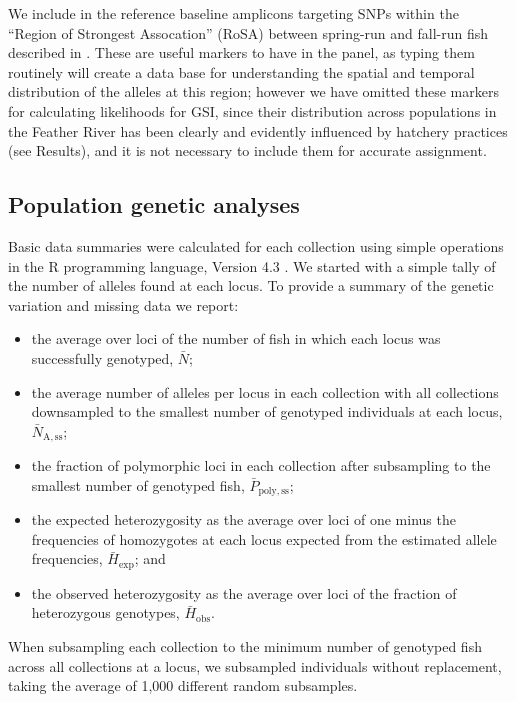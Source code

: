 We include in the reference baseline amplicons targeting SNPs within the ``Region of Strongest Assocation'' (RoSA)
between spring-run and fall-run fish described in \citet{thompson2020complex}.  These are useful markers to
have in the panel, as typing them routinely will create a data base for understanding the spatial and temporal
distribution of the alleles at this region; however we have omitted these markers for calculating likelihoods for
GSI, since their distribution across populations in the Feather River has been clearly and evidently
influenced by hatchery practices (see Results), and it is not necessary to include them for accurate assignment.

\subsection*{Population genetic analyses}

Basic data summaries were calculated for each collection
using simple operations in the R programming language, Version 4.3
\citep{rcore}. We started with a simple tally of the number of alleles
found at each locus.  To provide a summary of the genetic variation and
missing data we report:
\begin {itemize}
\item the average over loci of the number of fish
in which each locus was successfully genotyped, $\bar{N}$;
\item the average number of alleles per locus in each collection with all collections
downsampled to the smallest number of genotyped individuals at each
locus, $\bar{N}_\mathrm{A,ss}$;
\item the fraction of polymorphic
loci in each collection after subsampling to the smallest number of genotyped
fish, $\bar{P}_\mathrm{poly,ss}$;
\item the expected heterozygosity as the average over loci
of one minus the frequencies of homozygotes at each locus expected from the
estimated allele frequencies, $\bar{H}_\mathrm{exp}$; and 
\item the observed heterozygosity as the average over
loci of the fraction of heterozygous genotypes, $\bar{H}_\mathrm{obs}$.
\end{itemize}
When subsampling each collection to the minimum number of genotyped
fish across all collections at a locus, we subsampled individuals without
replacement, taking the average of 1,000 different random subsamples.  

